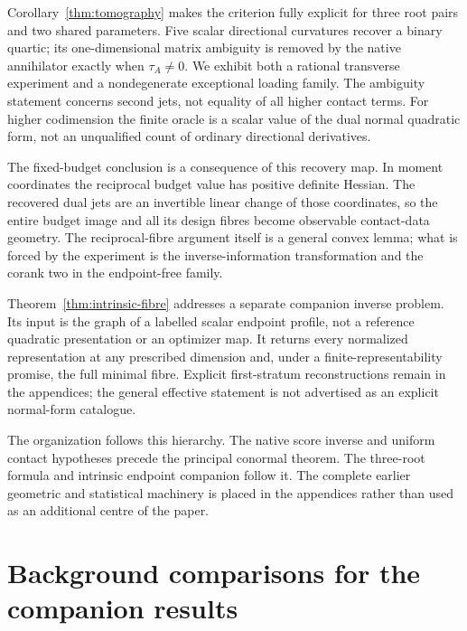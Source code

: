 \documentclass[11pt,reqno]{amsart}
\numberwithin{equation}{section}
\theoremstyle{definition}
\theoremstyle{remark}
\begin{document}
Corollary~\ref{thm:tomography} makes the criterion fully explicit for three root pairs and two shared parameters. Five scalar directional curvatures recover a binary quartic; its one-dimensional matrix ambiguity is removed by the native annihilator exactly when $\tau_A\ne0$. We exhibit both a rational transverse experiment and a nondegenerate exceptional loading family. The ambiguity statement concerns second jets, not equality of all higher contact terms. For higher codimension the finite oracle is a scalar value of the dual normal quadratic form, not an unqualified count of ordinary directional derivatives.

The fixed-budget conclusion is a consequence of this recovery map. In moment coordinates the reciprocal budget value has positive definite Hessian. The recovered dual jets are an invertible linear change of those coordinates, so the entire budget image and all its design fibres become observable contact-data geometry. The reciprocal-fibre argument itself is a general convex lemma; what is forced by the experiment is the inverse-information transformation and the corank two in the endpoint-free family.

Theorem~\ref{thm:intrinsic-fibre} addresses a separate companion inverse problem. Its input is the graph of a labelled scalar endpoint profile, not a reference quadratic presentation or an optimizer map. It returns every normalized representation at any prescribed dimension and, under a finite-representability promise, the full minimal fibre. Explicit first-stratum reconstructions remain in the appendices; the general effective statement is not advertised as an explicit normal-form catalogue.

The organization follows this hierarchy. The native score inverse and uniform contact hypotheses precede the principal conormal theorem. The three-root formula and intrinsic endpoint companion follow it. The complete earlier geometric and statistical machinery is placed in the appendices rather than used as an additional centre of the paper.







\appendix
\let\appendix\relax















\section{Background comparisons for the companion results}


\end{document}
